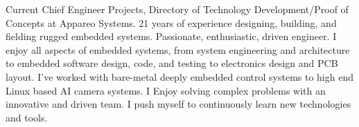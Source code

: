 

\begin{cvparagraph}

Current Chief Engineer Projects, Directory of Technology Development/Proof of Concepts at Appareo Systems. 21 years of experience designing, building, and fielding rugged embedded systems. Passionate, enthusiastic, driven engineer.
I enjoy all aspects of embedded systems, from system engineering and architecture to embedded software design, code, and testing to electronics design and PCB layout. I've worked with bare-metal deeply embedded control systems to high end Linux based AI camera systems. I Enjoy solving complex problems with an innovative and driven team. I push myself to continuously learn new technologies and tools.
\end{cvparagraph}
